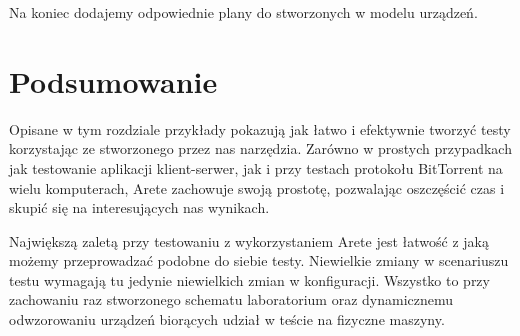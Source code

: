 \documentclass[00-praca-magisterska.tex]{subfiles}
\begin{document}
Na koniec dodajemy odpowiednie plany do stworzonych w modelu urządzeń.



\section{Podsumowanie}
\label{przyklady-podsumowanie}

Opisane w tym rozdziale przykłady pokazują jak łatwo i efektywnie tworzyć
testy korzystając ze stworzonego przez nas narzędzia. Zarówno w prostych 
przypadkach jak testowanie aplikacji klient-serwer, jak i przy testach 
protokołu BitTorrent na wielu komputerach, Arete zachowuje swoją prostotę, 
pozwalając oszczęścić czas i skupić się na interesujących nas wynikach.

Największą zaletą przy testowaniu z wykorzystaniem Arete jest łatwość z 
jaką możemy przeprowadzać podobne do siebie testy. Niewielkie zmiany w 
scenariuszu testu wymagają tu jedynie niewielkich zmian w konfiguracji. 
Wszystko to przy zachowaniu raz stworzonego schematu laboratorium oraz 
dynamicznemu odwzorowaniu urządzeń biorących udział w teście na fizyczne 
maszyny.
\end{document}
